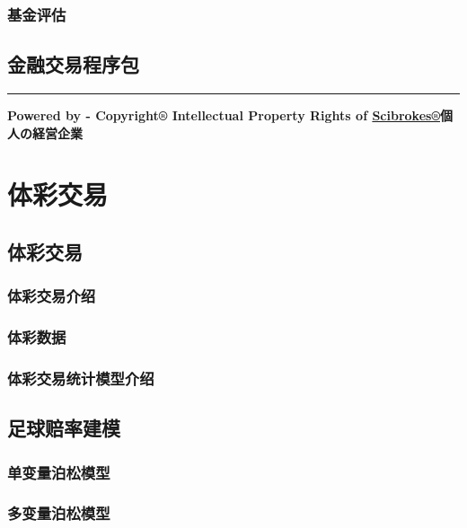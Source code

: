 \documentclass[]{book}
\theoremstyle{definition}
\theoremstyle{definition}
\theoremstyle{definition}
\theoremstyle{remark}
\begin{document}
\subsection{基金评估}

\section{金融交易程序包}

\begin{center}\rule{0.5\linewidth}{\linethickness}\end{center}

\textbf{Powered by - Copyright® Intellectual Property Rights of
\href{http://www.scibrokes.com}{Scibrokes®}個人の経営企業}

\hypertarget{sportsbook}{%
\chapter{体彩交易}\label{sportsbook}}

\section{体彩交易}

\subsection{体彩交易介绍}

\subsection{体彩数据}

\subsection{体彩交易统计模型介绍}

\section{足球赔率建模}

\subsection{单变量泊松模型}

\subsection{多变量泊松模型}
\end{document}
